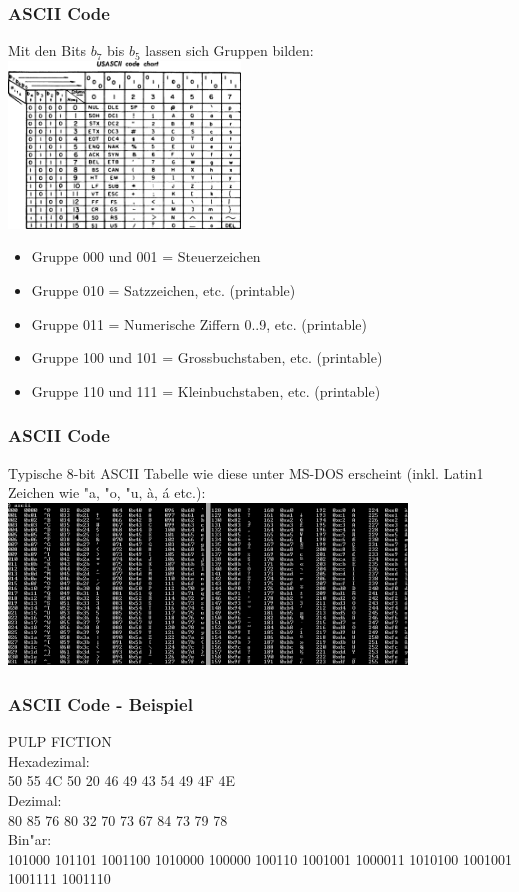 \documentclass{beamer}
\begin{document}
\frame
{
	\frametitle{ASCII Code}
	Mit den Bits $b_7$ bis $b_5$ lassen sich Gruppen bilden:\\
	\includegraphics[width=175pt]{USASCII_code_chart.png}
	\begin{itemize}
  		\item Gruppe 000 und 001 = Steuerzeichen
  		\item Gruppe 010 = Satzzeichen, etc. (printable)
  		\item Gruppe 011 = Numerische Ziffern 0..9, etc. (printable)
  		\item Gruppe 100 und 101 = Grossbuchstaben, etc. (printable)
  		\item Gruppe 110 und 111 = Kleinbuchstaben,  etc. (printable)
	\end{itemize}
}

\frame
{
	\frametitle{ASCII Code}
	Typische 8-bit ASCII Tabelle wie diese unter MS-DOS erscheint (inkl. Latin1 Zeichen wie "a, "o, "u, \`a, \'a etc.):
	\includegraphics[width=300pt]{Table_ascii_extended_Cygwin_App_ascii.png}

}

\frame
{
	\frametitle{ASCII Code - Beispiel}
	PULP FICTION\\
	\vspace{3mm}
	Hexadezimal:\\
	50 55 4C 50 20 46 49 43 54 49 4F 4E\\
	\vspace{3mm}
	Dezimal:\\
	80 85 76 80 32 70 73 67 84 73 79 78\\
	\vspace{3mm}
	Bin"ar:\\
	{\tiny 101000 101101 1001100 1010000 100000 100110  1001001 1000011 1010100 1001001 1001111 1001110}\\
}
\end{document}
